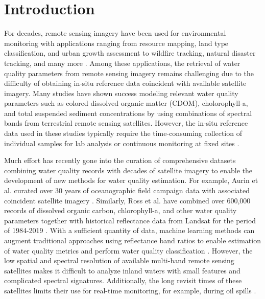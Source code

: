 \documentclass[sensors,article,submit,pdftex,moreauthors]{Definitions/mdpi}
\begin{document}
\section{Introduction}

For decades, remote sensing imagery have been used for environmental monitoring with applications ranging from resource mapping, land type classification, and urban growth assessment to wildfire tracking, natural disaster tracking, and many more \cite{cohen2004landsat, melesse2007remote, allison2016airborne, joyce2009review, robert2017analysis}. Among these applications, the retrieval of water quality parameters from remote sensing imagery remains challenging due to the difficulty of obtaining in-situ reference data coincident with available satellite imagery. Many studies have shown success modeling relevant water quality parameters such as colored dissolved organic matter (CDOM), cholorophyll-a, and total suspended sediment concentrations by using combinations of spectral bands from terrestrial remote sensing satellites. However, the in-situ reference data used in these studies typically require the time-consuming collection of individual samples for lab analysis or continuous monitoring at fixed sites \cite{brezonik2005landsat, paavel2011optical, gursoy2019investigating, bonansea2019using, sagan2020monitoring, remote-sensing-finland}. 

Much effort has recently gone into the curation of comprehensive datasets combining water quality records with decades of satellite imagery to enable the development of new methods for water quality estimation. For example, Aurin et al. curated over 30 years of oceanographic field campaign data with associated coincident satellite imagery \cite{aurin2018remote}. Similarly, Ross et al. have combined over 600,000 records of dissolved organic carbon, chlorophyll-a, and other water quality parameters together with historical reflectance data from Landsat for the period of 1984-2019 \cite{ross2019aquasat}. With a sufficient quantity of data, machine learning methods can augment traditional approaches using reflectance band ratios to enable estimation of water quality metrics and perform water quality classification \cite{schiller1999neural, brown2008neural, lary2010artificial, feng2015urban,belgiu2016random}. However, the low spatial and spectral resolution of available multi-band remote sensing satellites makes it difficult to analyze inland waters with small features and complicated spectral signatures. Additionally, the long revisit times of these satellites limits their use for real-time monitoring, for example, during oil spills \cite{fingas2017review}.
\end{document}
